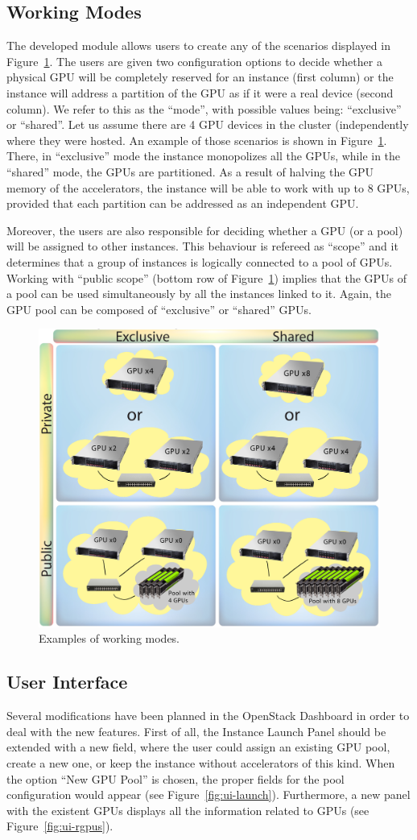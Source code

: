 \documentclass[a4paper,twoside]{article}
\begin{document}
\subsection{Working Modes}
The developed module allows users to create any of the scenarios displayed in Figure~\ref{fig2}. 
The users are given two configuration options to decide whether a physical GPU will be completely reserved for an instance (first column) or the instance will address a partition of the GPU as if it were a real device (second column).
We refer to this as the ``mode'', with possible values being: ``exclusive'' or ``shared''. 
Let us assume there are 4 GPU devices in the cluster (independently where they were hosted. 
An example of those scenarios is shown in Figure~\ref{fig2}.
There, in ``exclusive'' mode the instance monopolizes all the GPUs, while in the ``shared'' mode, the GPUs are partitioned. 
As a result of halving the GPU memory of the accelerators, the instance will be able to work with up to 8 GPUs, provided that each partition can be addressed as an independent GPU.

Moreover, the users are also responsible for deciding whether a GPU (or a pool) will be assigned to other instances. 
This behaviour is refereed as ``scope'' and it determines that a group of instances is logically connected to a pool of GPUs.
Working with ``public scope'' (bottom row of Figure~\ref{fig2}) implies that the GPUs of a pool can be used simultaneously by all the instances linked to it.
Again, the GPU pool can be composed of ``exclusive'' or ``shared'' GPUs.

\begin{figure}[htb]
  \centering
  \includegraphics[width=.5\textwidth]{images/workingmodes.jpg}
  \caption{Examples of working modes.}
  \label{fig2}
\end{figure}

\subsection{User Interface}
Several modifications have been planned in the OpenStack Dashboard in order to deal with the new features.
First of all, the Instance Launch Panel should be extended with a new field, where the user could assign an existing GPU pool, create a new one, or keep the instance without accelerators of this kind.
When the option ``New GPU Pool'' is chosen, the proper fields for the pool configuration would appear (see Figure~\ref{fig:ui-launch}).
Furthermore, a new panel with the existent GPUs displays all the information related to GPUs (see Figure~\ref{fig:ui-rgpus}).
\end{document}
